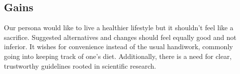 \subsection*{Gains}
Our persona would like to live a healthier lifestyle but it shouldn’t feel like a sacrifice. Suggested alternatives and changes should feel equally good and not inferior. It wishes for convenience instead of the usual handiwork, commonly going into keeping track of one's diet. Additionally, there is a need for clear, trustworthy guidelines rooted in scientific research.
